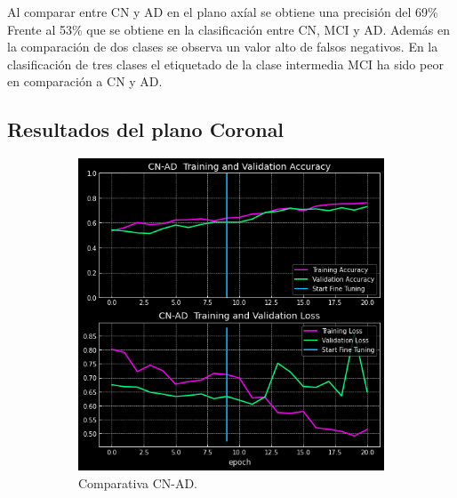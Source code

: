 Al comparar entre CN y AD en el plano axíal se obtiene una precisión del 69\%
Frente al 53\% que se obtiene en la clasificación entre CN, MCI y AD. Además  en la comparación de dos clases se
observa un valor alto de falsos negativos.
En la clasificación de tres clases el etiquetado de la clase intermedia MCI ha sido  peor en comparación a CN y AD.


\subsection{Resultados del plano Coronal}\label{subsec:resultados-del-plano-coronal}

\begin{figure}[H]
    \centering
    \begin{subfigure}{0.4\textwidth}
        \includegraphics[width=\textwidth]{./imgs/resultados/coronal/CN_AD_output_CORONAL}
        \caption{Comparativa CN-AD. }
        \label{fig:coronal-cn-ad}
    \end{subfigure}
    \hspace*{\fill}
    \begin{subfigure}{0.4\textwidth}

\end{subfigure}
\end{figure}
